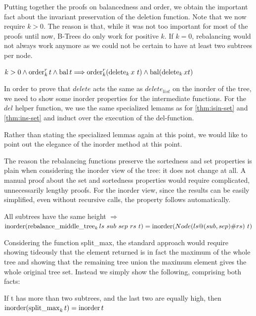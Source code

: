 Putting together the proofs on balancedness and
order, we obtain the important fact about the invariant preservation of the deletion function.
Note that we now require $k > 0$.
The reason is that, while it was not too important for most of the proofs until now,
B-Trees do only work for positive $k$.
If $k = 0$, rebalancing would not always work anymore
as we could not be certain to have at least two subtrees per node.

\begin{theorem}
    $k > 0 \wedge \operatorname{order}^r_k t \wedge \operatorname{bal} t \Longrightarrow
    \operatorname{order}^r_k (\operatorname{delete}_k x\ t) \wedge \operatorname{bal} (\operatorname{delete}_k x t)$
\end{theorem}

In order to prove that $delete$ acts the same as
$delete_{list}$ on the inorder of the tree,
we need to show some inorder properties for the intermediate functions.
For the $del$ helper function, 
we use the same specialized lemams
as for \autoref{thm:isin-set} and \autoref{thm:ins-set}
and induct over the execution of the del-function.

Rather than stating the specialized lemmas again at this point, we would like to point
out the elegance of the inorder method at this point.

The reason the rebalancing functions preserve the sortedness and set properties
is plain when considering the inorder view of the tree:
it does not change at all.
A manual proof about the set and sortedness properties
would require complicated, unnecessarily lengthy proofs.
For the inorder view, 
since the results can be easily simplified, even without recursive calls,
the property follows automatically.

\begin{lemma}
    \label{lem:rebalance-inorder}
    All subtrees have the same height $\Longrightarrow$ \\
    $\operatorname{inorder} (\operatorname{rebalance\_middle\_tree}_k ls\ sub\ sep\ rs\ t) = \operatorname{inorder} (Node (ls@(sub,sep)\#rs)\ t)$
\end{lemma}

Considering the function split\_max,
the standard approach would require showing
tideously that the element returned is in fact the maximum of the whole tree
and showing that the remaining tree union the maximum element
gives the whole original tree set.
Instead we simply show the following,
comprising both facts:

\begin{lemma}
    \label{lem:splitmax-inorder}
    If t has more than two subtrees, and the last two are equally high, then
    $\operatorname{inorder} (\operatorname{split\_max}_k t) = \operatorname{inorder} t$
\end{lemma}

